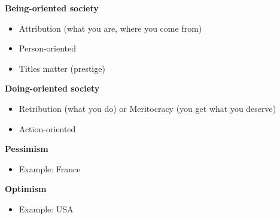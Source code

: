 \documentclass[11pt,a4paper,oneside,french,svgnames]{report}
\begin{document}
\begin{center}
\begin{minipage}[t]{.49\textwidth}
\centering\textbf{Being-oriented society}\\
  \begin{itemize}
    \item Attribution (what you are, where you come from)
    \item Person-oriented
    \item Titles matter (prestige)
  \end{itemize}
\end{minipage}
\begin{minipage}[t]{.49\textwidth}
\centering\textbf{Doing-oriented society}\\
  \begin{itemize}
    \item Retribution (what you do) or Meritocracy (you get what you deserve)
    \item Action-oriented
  \end{itemize}
\end{minipage}

\begin{minipage}[t]{.49\textwidth}
\centering\textbf{Pessimism}\\
  \begin{itemize}
    \item Example: France
  \end{itemize}
\end{minipage}
\begin{minipage}[t]{.49\textwidth}
\centering\textbf{Optimism}\\
  \begin{itemize}
    \item Example: USA
  \end{itemize}
\end{minipage}


\end{center}
\end{document}
